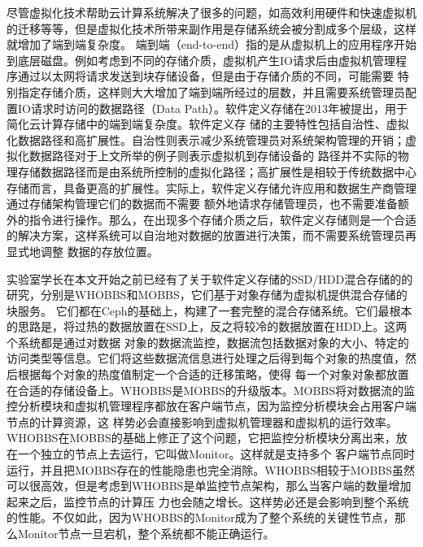 尽管虚拟化技术帮助云计算系统解决了很多的问题，如高效利用硬件和快速虚拟机的迁移等等，但是虚拟化技术所带来副作用是存储系统会被分割成多个层级，这样就增加了端到端复杂度\cite{wu2013software}。
端到端（end-to-end）指的是从虚拟机上的应用程序开始到底层磁盘。例如考虑到不同的存储介质，虚拟机产生IO请求后由虚拟机管理程序通过以太网将请求发送到块存储设备，但是由于存储介质的不同，可能需要
特别指定存储介质，这样则大大增加了端到端所经过的层数，并且需要系统管理员配置IO请求时访问的数据路径（Data Path）。软件定义存储在2013年被提出，用于简化云计算存储中的端到端复杂度。软件定义存
储的主要特性包括自治性、虚拟化数据路径和高扩展性\cite{carlson2014software}。自治性则表示减少系统管理员对系统架构管理的开销；虚拟化数据路径对于上文所举的例子则表示虚拟机到存储设备的
路径并不实际的物理存储数据路径而是由系统所控制的虚拟化路径；高扩展性是相较于传统数据中心存储而言，具备更高的扩展性。实际上，软件定义存储允许应用和数据生产商管理通过存储架构管理它们的数据而不需要
额外地请求存储管理员，也不需要准备额外的指令进行操作。那么，在出现多个存储介质之后，软件定义存储则是一个合适的解决方案，这样系统可以自治地对数据的放置进行决策，而不需要系统管理员再显式地调整
数据的存放位置。

实验室学长在本文开始之前已经有了关于软件定义存储的SSD/HDD混合存储的的研究，分别是WHOBBS\cite{lingxuan2015whobbs}和MOBBS\cite{ma2014mobbs}，它们基于对象存储为虚拟机提供混合存储的块服务。
它们都在Ceph\cite{weil2006ceph}的基础上，构建了一套完整的混合存储系统。它们最根本的思路是，将过热的数据放置在SSD上，反之将较冷的数据放置在HDD上。这两个系统都是通过对数据
对象的数据流监控，数据流包括数据对象的大小、特定的访问类型等信息。它们将这些数据流信息进行处理之后得到每个对象的热度值，然后根据每个对象的热度值制定一个合适的迁移策略，使得
每一个对象对象都放置在合适的存储设备上。WHOBBS是MOBBS的升级版本。MOBBS将对数据流的监控分析模块和虚拟机管理程序都放在客户端节点，因为监控分析模块会占用客户端节点的计算资源，这
样势必会直接影响到虚拟机管理器和虚拟机的运行效率。WHOBBS在MOBBS的基础上修正了这个问题，它把监控分析模块分离出来，放在一个独立的节点上去运行，它叫做Monitor。这样就是支持多个
客户端节点同时运行，并且把MOBBS存在的性能隐患也完全消除。WHOBBS相较于MOBBS虽然可以很高效，但是考虑到WHOBBS是单监控节点架构，那么当客户端的数量增加起来之后，监控节点的计算压
力也会随之增长。这样势必还是会影响到整个系统的性能。不仅如此，因为WHOBBS的Monitor成为了整个系统的关键性节点，那么Monitor节点一旦宕机，整个系统都不能正确运行。

